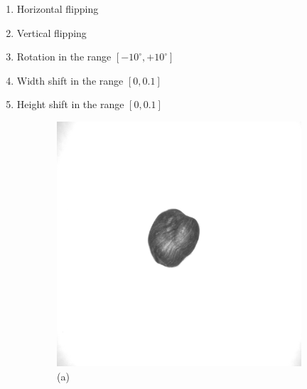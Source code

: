 \documentclass[12pt,DIV14,BCOR12mm,a4paper,footinclude=false,headinclude,parskip=half-,twoside,openright,cleardoublepage=empty,toc=index,bibliography=totoc,listof=totoc]{scrreprt}
\numberwithin{equation}{chapter}
\begin{document}
\begin{enumerate}
    \item Horizontal flipping
    \item Vertical flipping
    \item Rotation in the range $[-10^\circ, +10^\circ]$
    \item Width shift in the range $[0, 0.1]$
    \item Height shift in the range $[0, 0.1]$
\end{enumerate}
\begin{figure}
    \centering
    \begin{subfigure}[b]{0.45\textwidth}
        \centering
        \includegraphics[scale=0.15]{../media/Original1.png} %
        \caption*{(a)}
    \end{subfigure}
    \hfill
    \begin{subfigure}[b]{0.45\textwidth}
        \centering

\end{subfigure}
\end{figure}
\end{document}
